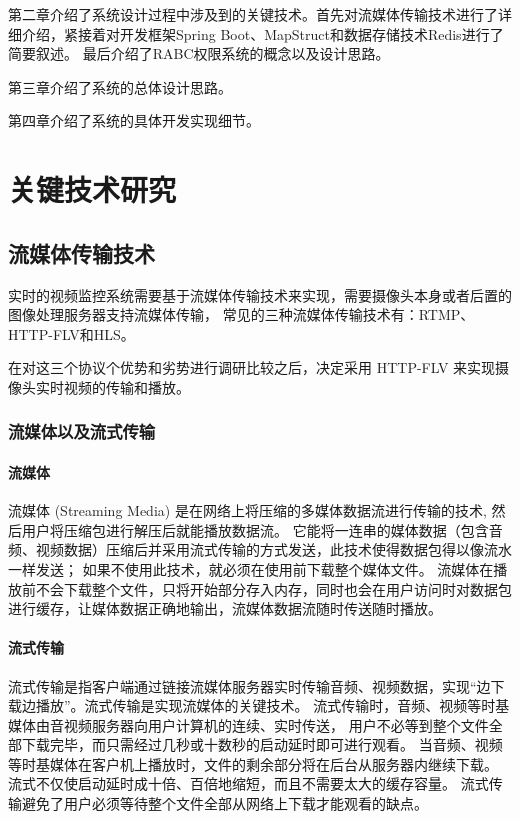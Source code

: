 第二章介绍了系统设计过程中涉及到的关键技术。首先对流媒体传输技术进行了详细介绍，紧接着对开发框架Spring Boot、MapStruct和数据存储技术Redis进行了简要叙述。
最后介绍了RABC权限系统的概念以及设计思路。

第三章介绍了系统的总体设计思路。

第四章介绍了系统的具体开发实现细节。

\chapter{关键技术研究}
\section{流媒体传输技术}
实时的视频监控系统需要基于流媒体传输技术来实现，需要摄像头本身或者后置的图像处理服务器支持流媒体传输，
常见的三种流媒体传输技术有：RTMP、HTTP-FLV和HLS。

在对这三个协议个优势和劣势进行调研比较之后，决定采用
HTTP-FLV 来实现摄像头实时视频的传输和播放。

\subsection{流媒体以及流式传输}
\subsubsection{流媒体}
流媒体 (Streaming Media) 是在网络上将压缩的多媒体数据流进行传输的技术, 然后用户将压缩包进行解压后就能播放数据流\cite{万梅芬2018基于流媒体技术的数字化校园文化设计与实现}。
它能将一连串的媒体数据（包含音频、视频数据）压缩后并采用流式传输的方式发送，此技术使得数据包得以像流水一样发送；
如果不使用此技术，就必须在使用前下载整个媒体文件。
流媒体在播放前不会下载整个文件，只将开始部分存入内存，同时也会在用户访问时对数据包进行缓存，让媒体数据正确地输出，流媒体数据流随时传送随时播放。

\subsubsection{流式传输}
流式传输是指客户端通过链接流媒体服务器实时传输音频、视频数据，实现“边下载边播放”。流式传输是实现流媒体的关键技术。
流式传输时，音频、视频等时基媒体由音视频服务器向用户计算机的连续、实时传送，
用户不必等到整个文件全部下载完毕，而只需经过几秒或十数秒的启动延时即可进行观看。
当音频、视频等时基媒体在客户机上播放时，文件的剩余部分将在后台从服务器内继续下载。
流式不仅使启动延时成十倍、百倍地缩短，而且不需要太大的缓存容量。
流式传输避免了用户必须等待整个文件全部从网络上下载才能观看的缺点。

